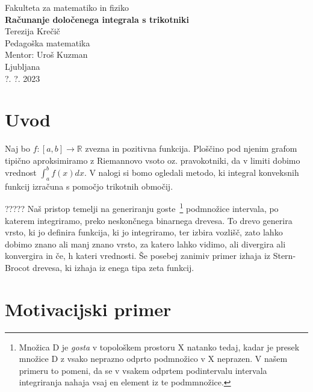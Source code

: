 \documentclass[a4paper, 12pt, titlepage]{article}
\begin{document}
\begin{titlepage}
    \begin{center}
        \large
        Fakulteta za matematiko in fiziko\\
        \vspace{8cm}
        \Huge
        \textbf{Računanje določenega integrala s trikotniki} \\
        \vspace{7cm}
        \large
        Terezija Krečič\\
        Pedagoška matematika\\
        \vspace{1cm}
        Mentor: Uroš Kuzman\\
        \vspace{0.5cm}
        Ljubljana\\
        ?. ?. 2023
    \end{center}
\end{titlepage}

\tableofcontents
\newpage

\section{Uvod}

Naj bo $ f: [a,b] \rightarrow \mathbb{R} $ zvezna in pozitivna funkcija. Ploščino pod njenim grafom tipično aproksimiramo z Riemannovo vsoto oz. pravokotniki, da v limiti dobimo vrednost $ \int_{a}^{b}f(x)dx $. V nalogi si bomo ogledali metodo, ki integral konveksnih funkcij izračuna s pomočjo trikotnih območij.

????? Naš pristop temelji na generiranju goste~\footnote{Množica D je \emph{gosta} v topološkem prostoru X natanko tedaj, kadar je presek množice D z vsako neprazno odprto podmnožico v X neprazen. V našem primeru to pomeni, da se v vsakem odprtem podintervalu intervala integriranja nahaja vsaj en element iz te podmmnožice.} podmnožice intervala, po katerem integriramo, preko neskončnega binarnega drevesa. To drevo generira vrsto, ki jo definira funkcija, ki jo integriramo, ter izbira vozlišč, zato lahko dobimo znano ali manj znano vrsto, za katero lahko vidimo, ali divergira ali konvergira in če, h kateri vrednosti. Še posebej zanimiv primer izhaja iz Stern-Brocot drevesa, ki izhaja iz enega tipa zeta funkcij.


\newpage
\section{Motivacijski primer}
\end{document}
